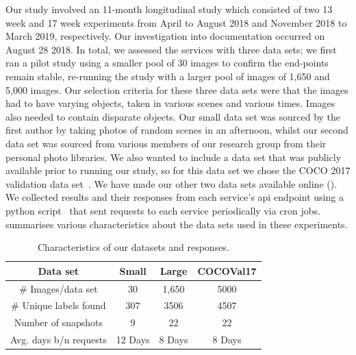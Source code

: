 Our study involved an 11-month longitudinal study which consisted of two 13 week and 17 week experiments from April to August 2018 and November 2018 to March 2019, respectively. Our investigation into documentation occurred on August 28 2018. In total, we assessed the services with three data sets; we first ran a pilot study using a smaller pool of 30 images to confirm the end-points remain stable, re-running the study with a larger pool of images of 1,650 and 5,000 images. Our selection criteria for these three data sets were that the images had to have varying objects, taken in various scenes and various times. Images also needed to contain disparate objects. Our small data set was sourced by the first author by taking photos of random scenes in an afternoon, whilst our second data set was sourced from various members of our research group from their personal photo libraries. We also wanted to include a data set that was publicly available prior to running our study, so for this data set we chose the COCO 2017 validation data set~\citep{Lin:2014vma}. We have made our other two data sets available online (). We collected results and their responses from each service's \gls{api} endpoint  using a  python script~ that sent requests to each service periodically via cron jobs.  summarises various characteristics about the data sets used in these experiments.

\begin{table}[t]
\caption[Characteristics of data in computer vision evolution assessment]{Characteristics of our datasets and responses.}
\label{icsme2019:tab:dataset}
\centering
\begin{tabular}{c||c|c|c}
  \toprule
  \textbf{Data set} & \textbf{Small} & \textbf{Large} & \textbf{COCOVal17} \\
  \midrule
  \# Images/data set & 30 & 1,650 & 5000 \\
  \# Unique labels found & 307 & 3506 & 4507\\
  Number of snapshots & 9 & 22 & 22 \\
  Avg. days b/n requests & 12 Days & 8 Days & 8 Days \\
  \bottomrule
\end{tabular}
\end{table}


